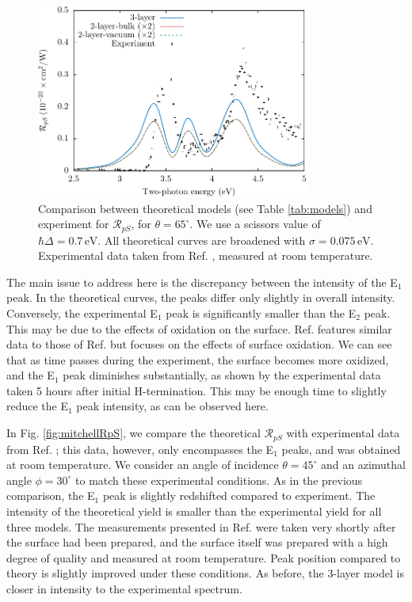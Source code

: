\documentclass[11pt]{book}
\begin{document}
\begin{figure}
\centering
\includegraphics[width=0.8\textwidth]{../figures/04-results/fig-4_4_01}
\caption{Comparison between theoretical models (see Table
\ref{tab:models}) and experiment for $\mathcal{R}_{pS}$, for
$\theta=65^{\circ}$. We use a scissors value of $\hbar\Delta = 0.7\,\text{eV}$.
All theoretical curves are broadened with $\sigma=0.075\,\text{eV}$.
Experimental data taken from Ref. \cite{mejiaPRB02}, measured at room
temperature.}
\label{fig:RpS}
\end{figure}

The main issue to address here is the discrepancy between the intensity of the E$_{1}$ peak. In the theoretical curves, the peaks differ only slightly in overall intensity. Conversely, the experimental E$_{1}$ peak is significantly smaller than the E$_{2}$ peak. This may be due to the effects of oxidation on the surface. Ref. \cite{bergfeldPRL04} features similar data to those of Ref. \cite{mejiaPRB02} but focuses on the effects of surface oxidation. We can see that as time passes during the experiment, the surface becomes more oxidized, and the E$_{1}$ peak diminishes substantially, as shown by the experimental data taken 5 hours after initial H-termination. This may be enough time to slightly reduce the E$_{1}$ peak intensity, as can be observed here.

In Fig. \ref{fig:mitchellRpS}, we compare the theoretical $\mathcal{R}_{pS}$ with experimental data from Ref. \cite{mitchellSS01}; this data, however, only encompasses the E$_{1}$ peaks, and was obtained at room temperature. We consider an angle of incidence $\theta=45^\circ$ and an azimuthal angle $\phi=30^\circ$ to match these experimental conditions. As in the previous comparison, the E$_{1}$ peak is slightly redshifted compared to experiment. The intensity of the theoretical yield is smaller than the experimental yield for all three models. The measurements presented in Ref. \cite{mitchellSS01} were taken very shortly after the surface had been prepared, and the surface itself was prepared with a high degree of quality and measured at room temperature. Peak position compared to theory is slightly improved under these conditions. As before, the 3-layer model is closer in intensity to the experimental spectrum.
\end{document}
